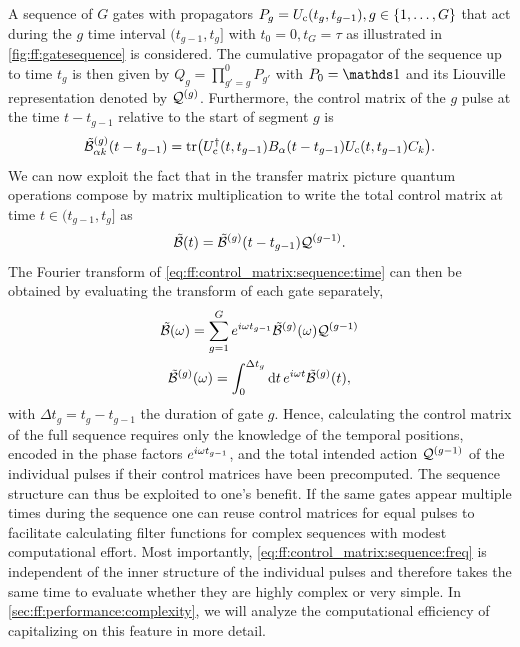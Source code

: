 A sequence of $G$ gates with propagators $P_g = U_{\mathrm{c}}(t_g, t_{g-1}), g\in\lbrace 1,\dotsc,G\rbrace$ that act during the $g$ time interval $(t_{g-1}, t_g]$ with $t_0 =  0, t_G = \tau$ as illustrated in \cref{fig:ff:gatesequence} is considered.
The cumulative propagator of the sequence up to time $t_g$ is then given by $Q_g = \prod_{g'=g}^0 P_{g'}$ with $P_0 = \eye$ and its Liouville representation denoted by $\mathcal{Q}^{(g)}$.
Furthermore, the control matrix of the $g$ pulse at the time $t - t_{g-1}$ relative to the start of segment $g$ is
\begin{equation}\label{eq:ff:control_matrix:pulse:time}
\tilde{\mathcal{B}}^{(g)}_{\alpha k}(t - t_{g-1}) = \tr(U_{\mathrm{c}}^\dagger(t, t_{g-1})B_\alpha(t - t_{g-1}) U_{\mathrm{c}}(t, t_{g-1}) C_k).
\end{equation}
We can now exploit the fact that in the transfer matrix picture quantum operations compose by matrix multiplication to write the total control matrix at time $t\in (t_{g-1}, t_g]$ as
\begin{equation}\label{eq:ff:control_matrix:sequence:time}
\tilde{\mathcal{B}}(t) = \tilde{\mathcal{B}}^{(g)}(t - t_{g-1})\mathcal{Q}^{(g-1)}.
\end{equation}
The Fourier transform of \cref{eq:ff:control_matrix:sequence:time} can then be obtained by evaluating the transform of each gate separately,
\begin{gather}
    \tilde{\mathcal{B}}(\omega) = \sum_{g = 1}^G e^{i\omega t_{g-1}}\tilde{\mathcal{B}}^{(g)}(\omega)\mathcal{Q}^{(g-1)} \label{eq:ff:control_matrix:sequence:freq}\\
    \tilde{\mathcal{B}}^{(g)}(\omega) = \int_0^{\Delta t_g}\dd{t}e^{i\omega t}\tilde{\mathcal{B}}^{(g)}(t), \label{eq:ff:control_matrix:pulse:freq}
\end{gather}
with $\Delta t_g = t_g - t_{g-1}$ the duration of gate $g$.
Hence, calculating the control matrix of the full sequence requires only the knowledge of the temporal positions, encoded in the phase factors $e^{i\omega t_{g-1}}$, and the total intended action $\mathcal{Q}^{(g-1)}$ of the individual pulses if their control matrices have been precomputed.
The sequence structure can thus be exploited to one's benefit.
If the same gates appear multiple times during the sequence one can reuse control matrices for equal pulses to facilitate calculating filter functions for complex sequences with modest computational effort.
Most importantly, \cref{eq:ff:control_matrix:sequence:freq} is independent of the inner structure of the individual pulses and therefore takes the same time to evaluate whether they are highly complex or very simple.
In \cref{sec:ff:performance:complexity}, we will analyze the computational efficiency of capitalizing on this feature in more detail.

